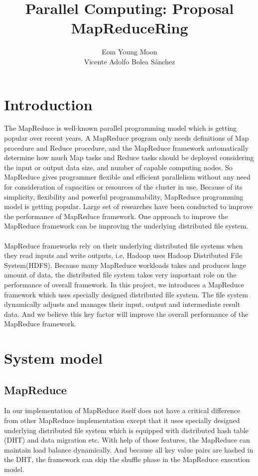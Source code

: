 \documentclass[11pt,a4paper]{article}
\begin{document}
\title{Parallel Computing: Proposal MapReduceRing}

\author{{Eom Young Moon}\\
        {Vicente Adolfo Bolea S\'anchez} 
}

\date{}
\maketitle

\begin{multicols}{2}
\raggedbottom
\setlength{\parskip}{0pt}

\section*{Introduction}
The MapReduce is well-known parallel programming model which is getting popular over recent years.
A MapReduce program only needs definitions of Map procedure and Reduce procedure, 
and the MapReduce framework automatically determine how much Map tasks and Reduce tasks should be 
deployed considering the input or output data size, and number of capable computing nodes.
So MapReduce gives programmer flexible and efficient parallelism without any need for consideration of 
capacities or resources of the cluster in use.
Because of its simplicity, flexibility and powerful programmability, MapReduce programming model is 
getting popular. Large set of researches have been conducted to improve the performance of MapReduce framework.
One approach to improve the MapReduce framework can be improving the underlying distributed file system. 
\\ \\
MapReduce frameworks rely on their underlying distributed file systems when they read inputs and write outputs, 
i.e, Hadoop uses Hadoop Distributed File System(HDFS). 
Because many MapReduce workloads takes and produces huge amount of data, 
the distributed file system takes very important role on the performance of overall framework. 
In this project, we introduces a MapReduce framework which uses specially designed distributed file system.
The file system dynamically adjusts and manages their input, output and intermediate result data. 
And we believe this key factor will improve the overall performance of the MapReduce framework.

\section*{System model}
\subsection*{MapReduce}
In our implementation of MapReduce itself does not have a critical difference from other MapReduce
implementation except that it uses specially designed underlying distributed file system which
is equipped with distributed hash table (DHT) and data migration etc. With help of those features,
the MapReduce can maintain load balance dynamically. And because all key value pairs are hashed
in the DHT, the framework can skip the shuffle phase in the MapReduce execution model. \\


\end{multicols}
\end{document}

